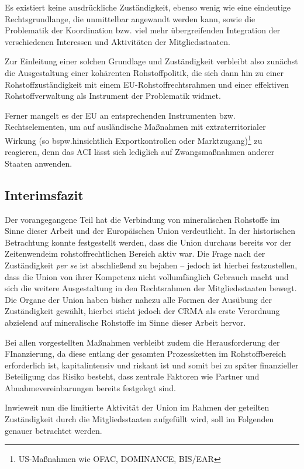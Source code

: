 \documentclass[12pt,a4paper,oneside]{book} %
\begin{document}
Es existiert keine ausdrückliche Zuständigkeit, ebenso wenig wie eine eindeutige Rechtsgrundlange, die unmittelbar angewandt werden kann, sowie die Problematik der Koordination bzw. viel mehr übergreifenden Integration der verschiedenen Interessen und Aktivitäten der Mitgliedsstaaten.

Zur Einleitung einer solchen Grundlage und Zuständigkeit verbleibt also zunächst die Ausgestaltung einer kohärenten Rohstoffpolitik, die sich dann hin zu einer Rohstoffzuständigkeit mit einem EU-Rohstoffrechtsrahmen und einer effektiven Rohstoffverwaltung als Instrument der Problematik widmet.

Ferner mangelt es der EU an entsprechenden Instrumenten bzw. Rechtselementen, um auf ausländische Maßnahmen mit extraterritorialer Wirkung (so bspw.hinsichtlich Exportkontrollen oder Marktzugang)\footnote{US-Maßnahmen wie OFAC, DOMINANCE, BIS/EAR} zu reagieren, denn das ACI lässt sich lediglich auf Zwangsmaßnahmen anderer Staaten anwenden. 


\subsection{Interimsfazit}
Der vorangegangene Teil hat die Verbindung von mineralischen Rohstoffe im Sinne dieser Arbeit und der Europäischen Union verdeutlicht. In der historischen Betrachtung konnte festgestellt werden, dass die Union durchaus bereits vor der \glqq Zeitenwende\grqq im rohstoffrechtlichen Bereich aktiv war.
Die Frage nach der Zuständigkeit \textit{per se} ist abschließend zu bejahen -- jedoch ist hierbei festzustellen, dass die Union von ihrer Kompetenz nicht vollumfänglich Gebrauch macht und sich die weitere Ausgestaltung in den Rechtsrahmen der Mitgliedsstaaten bewegt.
Die Organe der Union haben bisher nahezu alle Formen der Ausübung der Zuständigkeit gewählt, hierbei sticht jedoch der CRMA als erste Verordnung abzielend auf mineralische Rohstoffe im Sinne dieser Arbeit hervor.

Bei allen vorgestellten Maßnahmen verbleibt zudem die Herausforderung der FInanzierung, da diese entlang der gesamten Prozessketten im Rohstoffbereich erforderlich ist, kapitalintensiv und riskant ist und somit bei zu später finanzieller Beteiligung das Risiko besteht, dass zentrale Faktoren wie Partner und Abnahmevereinbarungen bereits festgelegt sind.\autocite{KAS: Vom Dialog zur Lieferkette, S. 36.}

Inwieweit nun die limitierte Aktivität der Union im Rahmen der geteilten Zuständigkeit durch die Mitgliedsstaaten aufgefüllt wird, soll im Folgenden genauer betrachtet
werden.
\end{document}
